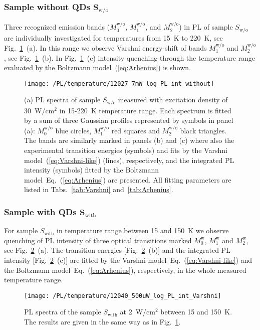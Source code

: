 \subsubsection*{Sample without QDs $\mathbf{S_\mathrm{w/o}}$}
%
Three recognized emission bands ($M_0^\mathrm{w/o}$, $M_1^\mathrm{w/o}$, and $M_2^\mathrm{w/o}$) in PL of sample ${S_\mathrm{w/o}}$ are individually investigated for temperatures from 15~K to 220~K, see Fig.~\ref{fig:QD_wo_temp}~(a). In this range we observe Varshni energy-shift of bands $M_1^\mathrm{w/o}$ and $M_2^\mathrm{w/o}$,
see Fig.~\ref{fig:QD_wo_temp}~(b). In Fig.~\ref{fig:QD_wo_temp}~(c) intensity quenching through the temperature range evaluated by the Boltzmann model~(\ref{eq:Arhenius}) is shown.
%
\begin{figure}
	\centering
	\texttt{[image: /PL/temperature/12027\_7mW\_log\_PL\_int\_without]}
	\caption{(a) PL spectra of sample $S_\mathrm{w/o}$ measured with excitation density of 30~W/cm$^2$ in 15-220~K temperature range. Each spectrum is fitted by a sum of three Gaussian profiles represented by symbols in panel (a): $M_0^\mathrm{w/o}$ blue circles, $M_1^\mathrm{w/o}$ red squares and $M_2^\mathrm{w/o}$ black triangles. The bands are similarly marked in panels (b) and (c) where also the experimental transition energies (symbols) and fits by the Varshni model~(\ref{eq:Varshni-like}) (lines), respectively, and the integrated PL intensity (symbols) fitted by the Boltzmann model~Eq.~(\ref{eq:Arhenius}) are presented. All fitting parameters are listed in Tabs.~\ref{tab:Varshni} and~\ref{tab:Arhenius}.}
	\label{fig:QD_wo_temp}
\end{figure}


\subsubsection*{Sample with QDs $\mathbf{S_\mathrm{with}}$}
%
For sample $S_\mathrm{with}$ in temperature range between 15 and 150~K we observe quenching of PL intensity of three optical transitions marked $M_0^\mathrm{w}$, $M_1^\mathrm{w}$ and $M_2^\mathrm{w}$, see Fig.~\ref{fig:QD_w_temp}~(a). The transition energies [Fig.~\ref{fig:QD_w_temp}~(b)] and the integrated PL intensity [Fig.~\ref{fig:QD_w_temp}~(c)] are fitted by the Varshni model~Eq.~(\ref{eq:Varshni-like}) and the Boltzmann model~Eq.~(\ref{eq:Arhenius}), respectively, in the whole measured temperature range.  
%
\begin{figure}
	\centering
	\texttt{[image: /PL/temperature/12040\_500uW\_log\_PL\_int\_Varshni]}
	\caption{PL spectra of the sample ${S_\mathrm{with}}$ at 2~W/cm$^2$ between 15 and 150~K. The results are given in the same way as in Fig.~\ref{fig:QD_wo_temp}.}
	\label{fig:QD_w_temp}
\end{figure}

